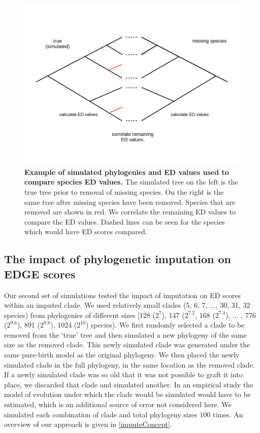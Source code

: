 \documentclass[12pt,english]{article}
\begin{document}
\begin{figure}[!ht]
  \center
  \includegraphics[width=.75\textwidth]{missingSpecies.png}
  \caption{\textbf{Example of simulated phylogenies and ED values used to
  compare species ED values.} The simulated tree on the left is the true tree
  prior to removal of missing species. On the right is the same tree after
  missing species have been removed. Species that are removed are shown in red.
  We correlate the remaining ED values to
  compare the ED values. Dashed lines can be seen for the species which would
  have ED scores compared.}
  \label{missingSpecies}
\end{figure}

\subsection*{The impact of phylogenetic imputation on EDGE scores}
Our second set of simulations tested the impact of imputation on ED scores
within an imputed clade. We used relatively small clades (5, 6, 7, ..., 30, 31,
32 species) from phylogenies of different sizes [128 ($2^7$), 147 ($2^{7.2}$, 168 ($2^{7.4}$), ... , 776 ($2^{9.6}$), 891 ($2^{9.8}$),
1024 ($2^{10}$) species). We first randomly selected a clade to be removed from the ‘true'
tree and then simulated a new phylogeny of the same size as the removed clade.
This newly simulated clade was generated under the same pure-birth model as the
original phylogeny. We then placed the newly simulated clade in the full
phylogeny, in the same location as the removed clade. If a newly simulated clade
was so old that it was not possible to graft it into place, we discarded that
clade and simulated another. In an empirical study the
model of evolution under which the clade would be simulated would have to be estimated,
which is an additional source of error not
considered here. We simulated each combination of clade and total phylogeny sizes 100 times.
An overview of our approach is given in \ref{imputeConcept}. 
\end{document}
